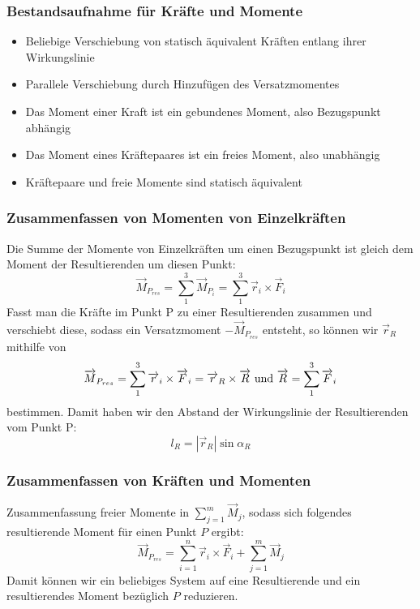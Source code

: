 \documentclass[a4paper,parskip=half*,DIV=7,fontsize=11pt]{scrartcl}
\begin{document}
	\subsubsection{Bestandsaufnahme für Kräfte und Momente}
	\begin{itemize}
		\item Beliebige Verschiebung von statisch äquivalent Kräften entlang ihrer Wirkungslinie
		\item Parallele Verschiebung durch Hinzufügen des Versatzmomentes
		\item Das Moment einer Kraft ist ein gebundenes Moment, also Bezugspunkt abhängig
		\item Das Moment eines Kräftepaares ist ein freies Moment, also unabhängig
		\item Kräftepaare und freie Momente sind statisch äquivalent
	\end{itemize}
	
	\subsubsection{Zusammenfassen von Momenten von Einzelkräften}
	Die Summe der Momente von Einzelkräften um einen Bezugspunkt ist gleich dem Moment der Resultierenden um diesen Punkt:
	$$\overrightarrow{M}_{P_{res}}=\sum_1^3 \overrightarrow{M}_{P_i}=\sum_1^3 \overrightarrow{r}_i \times \overrightarrow{F}_i$$
	Fasst man die Kräfte im Punkt P zu einer Resultierenden zusammen und verschiebt diese, sodass ein Versatzmoment $-\overrightarrow{M}_{P_{res}}$ entsteht, so können wir $\overrightarrow{r}_R$ mithilfe von
	$$\overrightarrow{M}_{P_{res}}=\sum_1^3 \overrightarrow{r}_i \times \overrightarrow{F}_i=\overrightarrow{r}_R \times \overrightarrow{R} \textnormal{ und } \overrightarrow{R}=\sum_1^3 \overrightarrow{F}_i$$
	bestimmen. Damit haben wir den Abstand der Wirkungslinie der Resultierenden vom
	Punkt P:
	$$l_R=|\overrightarrow{r}_R|\sin \alpha_R$$
	
	\subsubsection{Zusammenfassen von Kräften und Momenten}
	Zusammenfassung freier Momente in $\sum_{j=1}^m \overrightarrow{M}_j$, sodass sich folgendes resultierende Moment für einen Punkt $P$ ergibt:
	$$\overrightarrow{M}_{P_{res}}=\sum_{i=1}^n \overrightarrow{r}_i \times \overrightarrow{F}_i + \sum_{j=1}^m \overrightarrow{M}_j$$
	Damit können wir ein beliebiges System auf eine Resultierende und ein resultierendes Moment bezüglich $P$ reduzieren.
	
\end{document}
